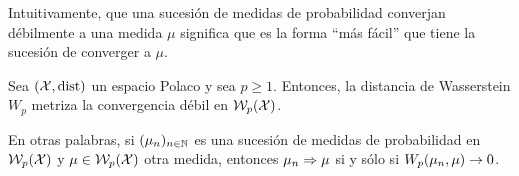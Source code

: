 \begin{note}
    Intuitivamente, que una sucesión de medidas de probabilidad converjan débilmente a una medida $\mu$ significa que es la forma ``más fácil'' que tiene la sucesión de converger a $\mu$.
\end{note}

\begin{theorem}
    Sea $(\cX, \dist)$ un espacio Polaco y sea $p \geq 1$. Entonces, la distancia de Wasserstein $W_p$  metriza la convergencia débil en $\WassersteinSpace[p]{\cX}$.
\end{theorem}

\begin{remark}
    En otras palabras, si $(\mu_n)_{n\in\N}$ es una sucesión de medidas de probabilidad en $\WassersteinSpace[p]{\cX}$ y $\mu\in \WassersteinSpace[p]{\cX} $ otra medida, entonces $\mu_n \wto \mu$ si y sólo si $\Wasserstein[p]{\mu_n}{\mu} \to 0$.
\end{remark}

